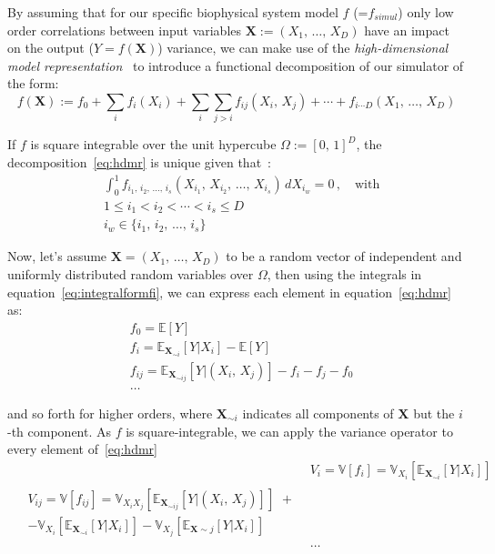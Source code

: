 \vspace{0.2cm}
By assuming that for our specific biophysical system model $f$ (=$f_{simul}$) only low order correlations between input variables $\mathbf{X}:=(X_1,\,\dots,\,X_D)$ have an impact on the output ($Y=f(\mathbf{X})$) variance, we can make use of the \textit{high-dimensional model representation}~\cite{Rabitz:1999} to introduce a functional decomposition of our simulator of the form:
%
\begin{equation}\label{eq:hdmr}
    f(\mathbf{X}) := f_{0} + \sum_{i}f_{i}(X_{i}) + \sum_{i}\sum_{j>i}f_{ij}(X_{i},\,X_{j}) + \cdots + f_{i\cdots D}(X_1,\,\dots,\,X_D)
\end{equation}

\noindent
If $f$ is square integrable over the unit hypercube $\Omega := [0,\,1]^{D}$, the decomposition~\eqref{eq:hdmr} is unique given that~\cite{Sobol:2003}:
%
\begin{align}\label{eq:integralformfi}
    & \int_0^1 f_{i_1,\,i_2,\,\dots,\,i_s}(X_{i_1},\,X_{i_2},\,\dots,\,X_{i_s})\,dX_{i_{w}} = 0\,,\quad\text{with} \\
    & 1 \le i_1 < i_2 < \cdots < i_s \le D \\
    & i_{w} \in \{i_1,\,i_2,\,\dots,\,i_s\}
\end{align}

\noindent
Now, let's assume $\mathbf{X} = (X_1,\,\dots,\,X_D)$ to be a random vector of independent and uniformly distributed random variables over $\Omega$, then using the integrals in equation~\eqref{eq:integralformfi}, we can express each element in equation~\eqref{eq:hdmr} as:
%
\begin{align}
    & f_{0} = \mathbb{E}[Y] \label{eq:f0var}\\
    & f_{i} = \mathbb{E}_{\mathbf{X}_{\sim i}}[Y|X_i] - \mathbb{E}[Y] \\
    & f_{ij} = \mathbb{E}_{\mathbf{X}_{\sim ij}}[Y|(X_i,\,X_j)] - f_i - f_j - f_0 \\
    &\dots
\end{align}
 
\noindent
and so forth for higher orders, where $\mathbf{X}_{\sim i}$ indicates all components of $\mathbf{X}$ but the $i$-th component. As $f$ is square-integrable, we can apply the variance operator to every element of~\eqref{eq:hdmr}
%
\begin{align}
    & V_{i} = \mathbb{V}[f_{i}] = \mathbb{V}_{X_i}[\mathbb{E}_{\mathbf{X}_{\sim i}}[Y|X_i]] \\
    \begin{split}
        & V_{ij} = \mathbb{V}[f_{ij}] = \mathbb{V}_{X_iX_j}[\mathbb{E}_{\mathbf{X}_{\sim ij}}[Y|(X_i,\,X_j)]]\,\,+ \\
        & - \mathbb{V}_{X_i}[\mathbb{E}_{\mathbf{X}_{\sim i}}[Y|X_i]] - \mathbb{V}_{X_j}[\mathbb{E}_{\mathbf{X}\sim j}[Y|X_i]]
    \end{split} \label{eq:varelements}\\
    &\dots
\end{align}

